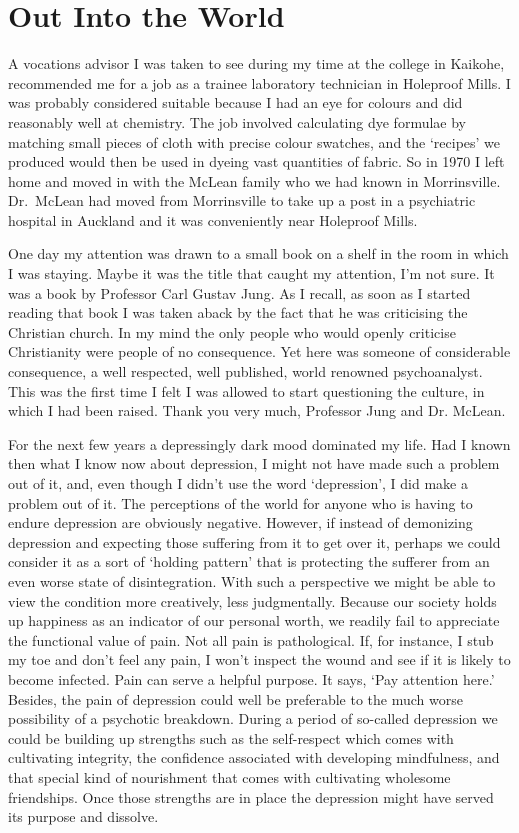 \chapter{Out Into the World}

A vocations advisor I was taken to see during my time at the college in
Kaikohe, recommended me for a job as a trainee laboratory technician in
Holeproof Mills. I was probably considered suitable because I had
an eye for colours and did reasonably well at chemistry. The job
involved calculating dye formulae by matching small pieces of cloth with
precise colour swatches, and the `recipes' we produced would then be
used in dyeing vast quantities of fabric. So in 1970 I left home and
moved in with the McLean family who we had known in Morrinsville.
Dr.~McLean had moved from Morrinsville to take up a post in a psychiatric
hospital in Auckland and it was conveniently near Holeproof Mills.

One day my attention was drawn to a small book on a shelf in the room in
which I was staying. Maybe it was the title that caught my attention,
I'm not sure. It was a book by Professor Carl Gustav Jung. As I recall,
as soon as I started reading that book I was taken aback by the fact
that he was criticising the Christian church. In my mind the only people
who would openly criticise Christianity were people of no consequence.
Yet here was someone of considerable consequence, a well respected, well
published, world renowned psychoanalyst. This was the first time I felt
I was allowed to start questioning the culture, in
which I had been raised. Thank you very much, Professor Jung and Dr. McLean.

For the next few years a depressingly dark mood dominated my life. Had I
known then what I know now about depression, I might not have made such
a problem out of it, and, even though I didn't use the word
`depression', I did make a problem out of it. The perceptions of the
world for anyone who is having to endure depression are obviously
negative. However, if instead of demonizing depression and expecting
those suffering from it to get over it, perhaps we could consider it as
a sort of `holding pattern' that is protecting the sufferer from an even
worse state of disintegration. With such a perspective we might be able
to view the condition more creatively, less judgmentally. Because our
society holds up happiness as an indicator of our personal worth, we
readily fail to appreciate the functional value of pain. Not all pain is
pathological. If, for instance, I stub my toe and don't feel any pain, I
won't inspect the wound and see if it is likely to become infected. Pain
can serve a helpful purpose. It says, `Pay attention here.' Besides, the
pain of depression could well be preferable to the much worse
possibility of a psychotic breakdown. During a period of so-called
depression we could be building up strengths such as the self-respect
which comes with cultivating integrity, the confidence associated with
developing mindfulness, and that special kind of nourishment that comes
with cultivating wholesome friendships. Once those strengths are in
place the depression might have served its purpose and dissolve.

